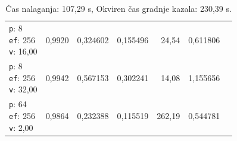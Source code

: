 \begin{table}[htbp]
\begin{tabularx}{\textwidth}{Xrrrrrr}
    \makecell{\texttt{p}: 8\\\texttt{ef}: 256\\\texttt{v}: 16,00} & 0,9920 & 0,324602 & 0,155496 & 24,54 & 0,611806 \\
    \makecell{\texttt{p}: 8\\\texttt{ef}: 256\\\texttt{v}: 32,00} & 0,9942 & 0,567153 & 0,302241 & 14,08 & 1,155656 \\
    \makecell{\texttt{p}: 64\\\texttt{ef}: 256\\\texttt{v}: 2,00} & 0,9864 & 0,232388 & 0,115519 & 262,19 & 0,544781 \\
    \bottomrule
  \end{tabularx}
\caption* {Čas nalaganja: 107,29 s, Okviren čas gradnje kazala: 230,39 s.}\end{table}

